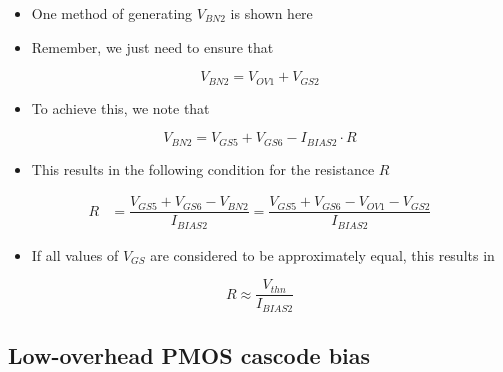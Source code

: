 \documentclass[11pt]{article}
\providecommand{\tightlist}{%
      \setlength{\itemsep}{0pt}\setlength{\parskip}{0pt}}
\begin{document}
    \begin{itemize}
\item
  One method of generating \(V_{BN2}\) is shown here
\item
  Remember, we just need to ensure that
\end{itemize}

\begin{equation}
V_{BN2} = V_{OV1} + V_{GS2}
\end{equation}

\begin{itemize}
\tightlist
\item
  To achieve this, we note that
\end{itemize}

\begin{equation}
V_{BN2} = V_{GS5} + V_{GS6} - I_{BIAS2}\cdot R
\end{equation}

\begin{itemize}
\tightlist
\item
  This results in the following condition for the resistance \(R\)
\end{itemize}

\begin{align}
R &= \dfrac{V_{GS5} + V_{GS6} - V_{BN2} }{I_{BIAS2}} = \dfrac{V_{GS5} + V_{GS6} - V_{OV1} - V_{GS2} }{I_{BIAS2}}
\end{align}

\begin{itemize}
\tightlist
\item
  If all values of \(V_{GS}\) are considered to be approximately equal,
  this results in
\end{itemize}

\begin{equation}
R \approx \dfrac{V_{thn}}{I_{BIAS2}}
\end{equation}

    \hypertarget{low-overhead-pmos-cascode-bias}{%
\subsection{Low-overhead PMOS cascode
bias}\label{low-overhead-pmos-cascode-bias}}
\end{document}
